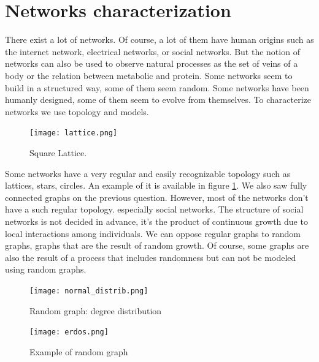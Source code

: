 \documentclass[a4paper, 12pt]{report}
\begin{document}
\section{Networks characterization}
There exist a lot of networks. Of course, a lot of them have human origins such as the internet network, electrical networks, or social networks. But the notion of networks can also be used to observe natural processes as the set of veins of a body or the relation between metabolic and protein. Some networks seem to build in a structured way, some of them seem random. Some networks have been humanly designed, some of them seem to evolve from themselves. To characterize networks we use topology and models.\\
\begin{figure}
\centering
\texttt{[image: lattice.png]}
\caption{Square Lattice. \citep{complex_networks} }
\label{lattice}
\end{figure}

Some networks have a very regular and easily recognizable topology such as lattices, stars, circles. An example of it is available in figure \ref{lattice}. We also saw fully connected graphs on the previous question. However, most of the networks don't have a such regular topology. especially social networks. The structure of social networks is not decided in advance, it's the product of continuous growth due to local interactions among individuals. We can oppose regular graphs to random graphs, graphs that are the result of random growth. Of course, some graphs are also the result of a process that includes randomness but can not be modeled using random graphs.\\
\begin{figure}
\centering
\texttt{[image: normal\_distrib.png]}
\caption{Random graph: degree distribution}
\label{random}
\end{figure}

\begin{figure}
\centering
\texttt{[image: erdos.png]}
\caption{Example of random graph\citep{erdos_image}}
\label{erdos}
\end{figure}
\end{document}
